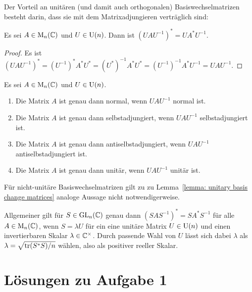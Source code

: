 \documentclass[a4paper, 10pt, numbers=noenddot]{scrartcl}
\begin{document}
Der Vorteil an unitären (und damit auch orthogonalen) Basiswechselmatrizen besteht darin, dass sie mit dem Matrixadjungieren verträglich sind:


\begin{lemma}\label{lemma: unitary basis change matrices}
  Es sei $A \in \operatorname{M}_n(\mathbb{C})$ und $U \in \operatorname{U}(n)$.
  Dann ist $(U \! A U^{-1})^* = U \! A^* U^{-1}$.
\end{lemma}
\begin{proof}
  Es ist
  $
      (U \! A U^{-1})^*
    = (U^{-1})^* A^* U^*
    = (U^*)^{-1} A^* U^*
    = (U^{-1})^{-1} A^* U^{-1}
    = U \! A U^{-1}.
  $
\end{proof}


\begin{corollary}\label{cor: properties and unitary basis change}
  Es sei $A \in \operatorname{M}_n(\mathbb{C})$ und $U \in \operatorname{U}(n)$.
  \begin{enumerate}[leftmargin=*]
    \item
      Die Matrix $A$ ist genau dann normal, wenn $U \! A U^{-1}$ normal ist.
    \item
      Die Matrix $A$ ist genau dann selbstadjungiert, wenn $U \! A U^{-1}$ selbstadjungiert ist.
    \item
      Die Matrix $A$ ist genau dann antiselbstadjungiert, wenn $U \! A U^{-1}$ antiselbstadjungiert ist.
    \item
      Die Matrix $A$ ist genau dann unitär, wenn $U \! A U^{-1}$ unitär ist.
  \end{enumerate}
\end{corollary}


\begin{remark}
  Für nicht-unitäre Basiswechselmatrizen gilt zu zu Lemma~\ref{lemma: unitary basis change matrices} analoge Aussage nicht notwendigerweise.
  
  Allgemeiner gilt für $S \in \operatorname{GL}_n(\mathbb{C})$ genau dann $(S A S^{-1})^* = S A^* S^{-1}$ für alle $A \in \operatorname{M}_n(\mathbb{C})$, wenn $S = \lambda U$ für ein eine unitäre Matrix $U \in \operatorname{U}(n)$ und einen invertierbaren Skalar $\lambda \in \mathbb{C}^\times$.
  Durch passende Wahl von $U$ lässt sich dabei $\lambda$ als $\lambda = \sqrt{\operatorname{tr}(S^* S)/n}$ wählen, also als positiver reeller Skalar.
\end{remark}










\section{Lösungen zu Aufgabe 1}
\end{document}

